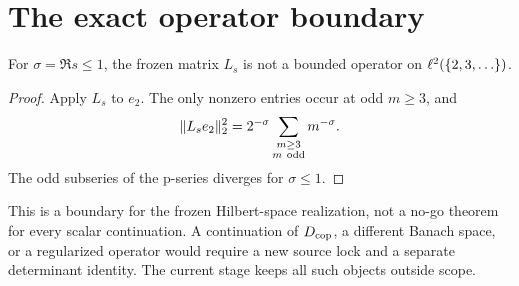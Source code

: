 \section{The exact operator boundary}

\begin{proposition}
For \(\sigma=\Re s\leq1\), the frozen matrix \(L_s\) is not a bounded
operator on \(\ell^2(\{2,3,\ldots\})\).
\end{proposition}

\begin{proof}
Apply \(L_s\) to \(e_2\).  The only nonzero entries occur at odd \(m\geq3\),
and
\[
\lVert L_se_2\rVert_2^2
=2^{-\sigma}\sum_{\substack{m\geq3\\m\ {\rm odd}}}m^{-\sigma}.
\]
The odd subseries of the p-series diverges for \(\sigma\leq1\).
\end{proof}

This is a boundary for the frozen Hilbert-space realization, not a no-go
theorem for every scalar continuation.  A continuation of \(D_{\mathrm{cop}}\), a
different Banach space, or a regularized operator would require a new source
lock and a separate determinant identity.  The current stage keeps all such
objects outside scope.
